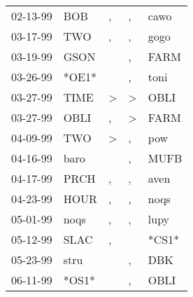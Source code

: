 \begin{supertabular}{p{0.07\textwidth}p{0.06\textwidth}p{0.02\textwidth}p{0.02\textwidth}p{0.06\textwidth}}
          02-13-99\textsuperscript{} &            BOB\textsuperscript{} &                , &                , &           cawo\textsuperscript{} \\
          03-17-99\textsuperscript{} &            TWO\textsuperscript{} &                , &                , &           gogo\textsuperscript{} \\
          03-19-99\textsuperscript{} &           GSON\textsuperscript{} &                  &                , &           FARM\textsuperscript{} \\
          03-26-99\textsuperscript{} &                            *OE1* &                  &                , &           toni\textsuperscript{} \\
          03-27-99\textsuperscript{} &           TIME\textsuperscript{} &     \textgreater &     \textgreater &           OBLI\textsuperscript{} \\
          03-27-99\textsuperscript{} &           OBLI\textsuperscript{} &                , &     \textgreater &           FARM\textsuperscript{} \\
          04-09-99\textsuperscript{} &            TWO\textsuperscript{} &     \textgreater &                , &            pow\textsuperscript{} \\
          04-16-99\textsuperscript{} &           baro\textsuperscript{} &                  &                , &           MUFB\textsuperscript{} \\
          04-17-99\textsuperscript{} &           PRCH\textsuperscript{} &                , &                , &           aven\textsuperscript{} \\
          04-23-99\textsuperscript{} &           HOUR\textsuperscript{} &                , &                , &           noqs\textsuperscript{} \\
          05-01-99\textsuperscript{} &           noqs\textsuperscript{} &                , &                , &           lupy\textsuperscript{} \\
          05-12-99\textsuperscript{} &           SLAC\textsuperscript{} &                , &                  &                            *CS1* \\
          05-23-99\textsuperscript{} &           stru\textsuperscript{} &                  &                , &            DBK\textsuperscript{} \\
          06-11-99\textsuperscript{} &                            *OS1* &                  &                , &           OBLI\textsuperscript{} \\

\end{supertabular}
